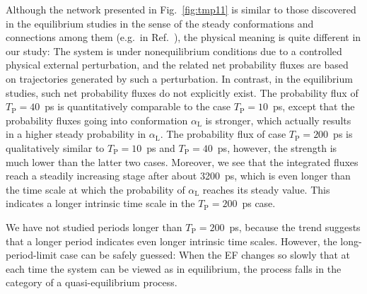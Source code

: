 \documentclass[a4paper,preprint,unsortedaddress,onecolumn]{revtex4-1}
\newcommand{\recheck}[1]{{\color{red} #1}}
\newcommand{\period}[0]{T_{\textrm{P}}}
\newcommand{\confc}[0]{{\alpha_{\textrm{L}}}}
\begin{document}
\recheck{
  Although the network presented in Fig.~\ref{fig:tmp11} is similar to those
  discovered in the equilibrium studies 
  in the sense of the steady conformations and connections among them (e.g.~in Ref.~\cite{apostolakis1999calculation, gfeller2007complex}),
  the physical meaning is quite different in our study:
  The system is under nonequilibrium conditions due to a controlled physical external perturbation, and
  the related net probability fluxes are based on trajectories generated by such a perturbation. In contrast, in the equilibrium studies,
  such net probability fluxes do not explicitly exist.
}
The probability flux of $\period =40$~ps is quantitatively
comparable to the case $\period =10$~ps, except that the probability fluxes
going into conformation $\confc$ is stronger, which actually results in
a higher steady probability in $\confc$.
The probability flux of case $\period =200$~ps is qualitatively
similar to $\period =10$~ps and $\period =40$~ps, however,
the strength is much lower than the latter two cases.
Moreover, 
  we see that the integrated fluxes reach
  a steadily
increasing stage after about 3200~ps, which is even longer than the time scale
at which the probability of $\confc$ reaches its steady value. This indicates
a longer intrinsic time scale in the $\period =200$~ps case.

We have not studied periods longer than $\period =200$~ps, because
the trend suggests that a longer period indicates even longer intrinsic time scales.
However, the long-period-limit case can be safely guessed: When
the EF changes so slowly that
at each time the system
can be viewed as in equilibrium,
the process falls in the category of a quasi-equilibrium
process. 
\end{document}
